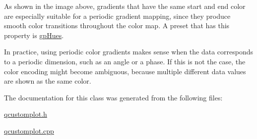 As shown in the image above, gradients that have the same start and end color are especially suitable for a periodic gradient mapping, since they produce smooth color transitions throughout the color map. A preset that has this property is \hyperlink{classQCPColorGradient_aed6569828fee337023670272910c9072a30efe58407acfb67939032f70213a130}{gp\+Hues}.

In practice, using periodic color gradients makes sense when the data corresponds to a periodic dimension, such as an angle or a phase. If this is not the case, the color encoding might become ambiguous, because multiple different data values are shown as the same color. 

The documentation for this class was generated from the following files\+:\begin{DoxyCompactItemize}
\item 
\hyperlink{qcustomplot_8h}{qcustomplot.\+h}\item 
\hyperlink{qcustomplot_8cpp}{qcustomplot.\+cpp}\end{DoxyCompactItemize}

